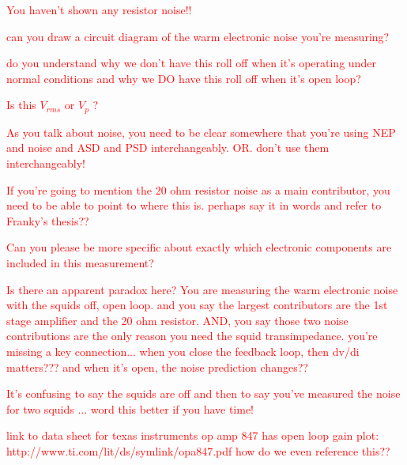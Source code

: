 \textcolor{red}{You haven't shown any resistor noise!!}

\textcolor{red}{can you draw a circuit diagram of the warm electronic noise you're measuring?}


\textcolor{red}{do you understand why we don't have this roll off when it's operating under normal conditions and why we DO have this roll off when it's open loop?}

\textcolor{red}{Is this $V_{rms}$ or $V_{p}$ ?}

\textcolor{red}{As you talk about noise, you need to be clear somewhere that you're using NEP and noise and ASD and PSD interchangeably. OR. don't use them interchangeably!}


\textcolor{red}{If you're going to mention the 20 ohm resistor noise as a main contributor, you need to be able to point to where this is. perhaps say it in words and refer to Franky's thesis??}


\textcolor{red}{Can you please be more specific about exactly which electronic components are included in this measurement?}

\textcolor{red}{Is there an apparent paradox here? You are measuring the warm electronic noise with the squids off, open loop. and you say the largest contributors are the 1st stage amplifier and the 20 ohm resistor. AND, you say those two noise contributions are the only reason you need the squid transimpedance. you're missing a key connection... when you close the feedback loop, then dv/di matters??? and when it's open, the noise prediction changes??}

\textcolor{red}{It's confusing to say the squids are off and then to say you've measured the noise for two squids ... word this better if you have time!}

\textcolor{red}{link to data sheet for texas instruments op amp 847 has open loop gain plot: http://www.ti.com/lit/ds/symlink/opa847.pdf    how do we even reference this??}

